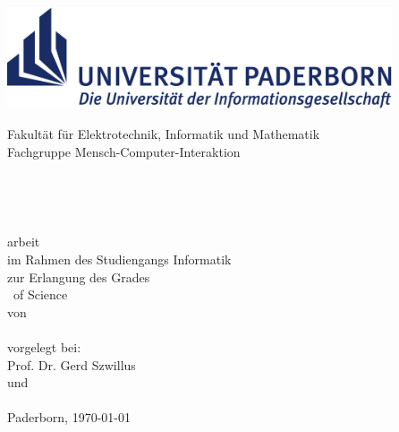 
\thispagestyle{empty}
\begin{titlepage}
\begin{center}

	\begin{minipage}{14cm}		
		\hspace*{1.9cm}
		\includegraphics[height=3cm]{figures/upb_logo}\\
		\begin{minipage}{9.5cm}
			\vspace*{5pt}
			\textsf{\noindent
			Fakultät für Elektrotechnik, Informatik und Mathematik\\
			Fachgruppe Mensch-Computer-Interaktion
			}
		\end{minipage}		
	\end{minipage}\\[60pt]
	
	\begin{doublespace}
		{\Huge\textbf{\Title}}\\[30pt]
	\end{doublespace} 
	
	{\Large 
			\Degree arbeit
	}\\[6pt]
			im Rahmen des Studiengangs Informatik\\
			zur Erlangung des Grades
		\\[6pt]
  	{\Large \Degree\ of Science}\\[54pt] %
	
		von\\
	{\scshape\large \Author}\\[54pt]
	
		vorgelegt bei:\\
	
	{\large Prof. Dr. Gerd Szwillus \\
		und
	\\[6pt]
	\large \SecondExaminer}\\[30pt]

	{Paderborn, \today}
	
\end{center}
\end{titlepage}
\clearpage
